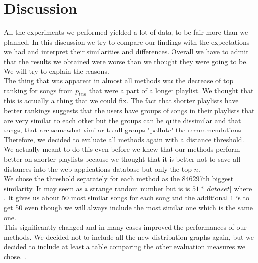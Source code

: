 \section{Discussion}\label{sec:discussion}

All the experiments we performed yielded a lot of data, to be fair more than we planned. In this discussion we try to compare our findings with the expectations we had and interpret their similarities and differences. Overall we have to admit that the results we obtained were worse than we thought they were going to be. We will try to explain the reasons. \\
The thing that was apparent in almost all methods was the decrease of top ranking for songs from $ p_{test}$ that were a part of a longer playlist. We thought that this is actually a thing that we could fix. The fact that shorter playlists have better rankings suggests that the users have groups of songs in their playlists that are very similar to each other but the groups can be quite dissimilar and that songs, that are somewhat similar to all groups "pollute" the recommendations. Therefore, we decided to evaluate all methods again with a distance threshold. We actually meant to do this even before we knew that our methods perform better on shorter playlists because we thought that it is better not to save all distances into the web-applications database but only the top $n$. \\
We chose the threshold separately for each method as the 846297th biggest similarity. It may seem as a strange random number but is is $51*|dataset|$ where . It gives us about 50 most similar songs for each song and the additional 1 is to get 50 even though we will always include the most similar one which is the same one. \\
This significantly changed and in many cases improved the performances of our methods. We decided not to include all the new distribution graphs again,  but we decided to include at least a table comparing the other evaluation measures we chose. .\\

